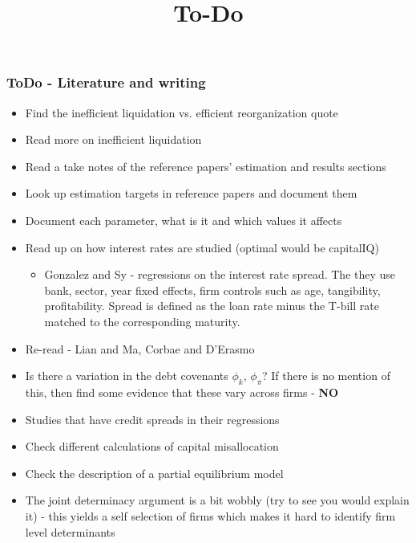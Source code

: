 \documentclass[12pt]{article}
\title{To-Do}
\date{}
\begin{document}
\subsubsection*{ToDo - Literature and writing}
\begin{itemize}\setlength\itemsep{0em} \small
    \item Find the inefficient liquidation vs. efficient reorganization quote \checkmark 
    \item Read more on inefficient liquidation \checkmark
    \item Read a take notes of the reference papers' estimation and results sections \checkmark
    \item Look up estimation targets in reference papers and document them \checkmark
    \item Document each parameter, what is it and which values it affects \checkmark
    \item Read up on how interest rates are studied (optimal would be capitalIQ) \checkmark
    \begin{itemize}
        \item Gonzalez and Sy - regressions on the interest rate spread. The they use bank, sector, year fixed effects, firm controls such as age, tangibility, profitability. Spread is defined as the loan rate minus the T-bill rate matched to the corresponding maturity. 
    \end{itemize}
    \item Re-read - Lian and Ma, Corbae and D'Erasmo \checkmark
    \item Is there a variation in the debt covenants $\phi_k$, $\phi_\pi$? If there is no mention of this, then find some evidence that these vary across firms - \textbf{NO} \checkmark 
    \item Studies that have credit spreads in their regressions \checkmark
    \item Check different calculations of capital misallocation \checkmark
    \item Check the description of a partial equilibrium model  
    \item The joint determinacy argument is a bit wobbly (try to see you would explain it) - this yields a self selection of firms which makes it hard to identify firm level determinants
\end{itemize} \normalsize

\newpage
\end{document}
